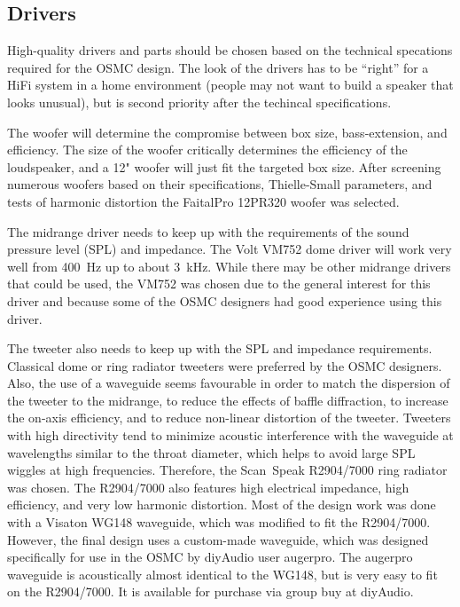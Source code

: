 \documentclass[12pt,a4paper]{article}
\providecommand{\seclabel}[1]{\label{sec:#1}}
\begin{document}
\subsection{Drivers}\seclabel{drivers}

High-quality drivers and parts should be chosen based on the technical specations required for the OSMC design. The look of the drivers has to be ``right'' for a HiFi system in a home environment (people may not want to build a speaker that looks unusual), but is second priority after the techincal specifications.

The woofer will determine the compromise between box size, bass-extension, and efficiency. 
The size of the woofer critically determines the efficiency of the loudspeaker, and a 12" woofer will just fit the targeted box size. After screening numerous woofers based on their specifications, Thielle-Small parameters, and tests of harmonic distortion the FaitalPro 12PR320 woofer was selected.\cite{osmc_p162,osmc_p236}

The midrange driver needs to keep up with the requirements of the sound pressure level (SPL) and impedance. The Volt VM752 dome driver will work very well from \SI{400}{Hz} up to about \SI{3}{kHz}. While there may be other midrange drivers that could be used, the VM752 was chosen due to the general interest for this driver and because some of the OSMC designers had good experience using this driver.

The tweeter also needs to keep up with the SPL and impedance requirements. Classical dome or ring radiator tweeters were preferred by the OSMC designers. Also, the use of a waveguide seems favourable in order to match the dispersion of the tweeter to the midrange, to reduce the effects of baffle diffraction, to increase the on-axis efficiency, and to reduce non-linear distortion of the tweeter. Tweeters with high directivity tend to minimize acoustic interference with the waveguide at wavelengths similar to the throat diameter, which helps to avoid large SPL wiggles at high frequencies\cite{ringradiators_in_waveguides}. Therefore, the Scan~Speak R2904/7000 ring radiator was chosen. The R2904/7000 also features high electrical impedance, high efficiency, and very low harmonic distortion. Most of the design work was done with a Visaton WG148 waveguide, which was modified to fit the R2904/7000.\cite{WG148mod} However, the final design uses a custom-made waveguide, which was designed specifically for use in the OSMC by diyAudio user augerpro\cite{augerproWGcircular}. The augerpro waveguide is acoustically almost identical to the WG148\cite{osmc_p881}, but is very easy to fit on the R2904/7000. It is available for purchase via group buy at diyAudio.\cite{augerpro_groupbuy}
\end{document}
